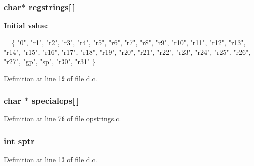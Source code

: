 \subsubsection[{regstrings}]{\setlength{\rightskip}{0pt plus 5cm}char$\ast$ regstrings[$\,$]}\label{d_8c_a5fd0fa7dbf194f1fa896ed304ed7da4c}
{\bfseries Initial value\+:}
\begin{DoxyCode}
=
\{
\textcolor{stringliteral}{"0"}, \textcolor{stringliteral}{"r1"}, \textcolor{stringliteral}{"r2"}, \textcolor{stringliteral}{"r3"}, \textcolor{stringliteral}{"r4"}, \textcolor{stringliteral}{"r5"}, \textcolor{stringliteral}{"r6"}, \textcolor{stringliteral}{"r7"}, \textcolor{stringliteral}{"r8"}, \textcolor{stringliteral}{"r9"},
\textcolor{stringliteral}{"r10"}, \textcolor{stringliteral}{"r11"}, \textcolor{stringliteral}{"r12"}, \textcolor{stringliteral}{"r13"}, \textcolor{stringliteral}{"r14"}, \textcolor{stringliteral}{"r15"}, \textcolor{stringliteral}{"r16"}, \textcolor{stringliteral}{"r17"}, \textcolor{stringliteral}{"r18"}, \textcolor{stringliteral}{"r19"},
\textcolor{stringliteral}{"r20"}, \textcolor{stringliteral}{"r21"}, \textcolor{stringliteral}{"r22"}, \textcolor{stringliteral}{"r23"}, \textcolor{stringliteral}{"r24"}, \textcolor{stringliteral}{"r25"}, \textcolor{stringliteral}{"r26"}, \textcolor{stringliteral}{"r27"}, \textcolor{stringliteral}{"gp"}, \textcolor{stringliteral}{"sp"},
\textcolor{stringliteral}{"r30"}, \textcolor{stringliteral}{"r31"}
\}
\end{DoxyCode}


Definition at line 19 of file d.\+c.

\subsubsection[{specialops}]{\setlength{\rightskip}{0pt plus 5cm}char $\ast$ specialops[$\,$]}\label{d_8c_a1b270a15f140a650d2a21a5e4cffab0e}


Definition at line 76 of file opstrings.\+c.

\subsubsection[{sptr}]{\setlength{\rightskip}{0pt plus 5cm}int sptr}\label{d_8c_a8b08ff7be2cd55a03175cdd3ccf7575e}


Definition at line 13 of file d.\+c.

